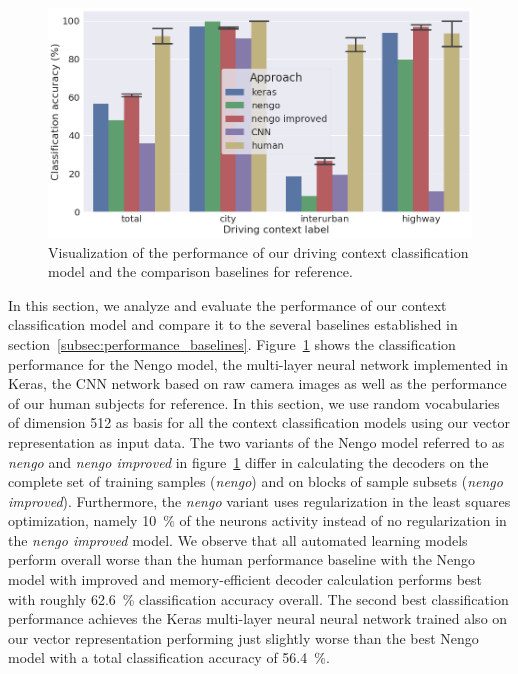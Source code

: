 \begin{figure}[t]
    \centering
    \includegraphics[width=0.9\linewidth]{imgs/context_class_approaches.png}
    \caption{Visualization of the performance of our driving context classification model and the comparison baselines for reference.}
    \label{fig:context_class_approaches}
\end{figure}

In this section, we analyze and evaluate the performance of our context classification model and compare it to the several baselines established in section~\ref{subsec:performance_baselines}.
Figure~\ref{fig:context_class_approaches} shows the classification performance for the \ac{Nengo} model, the multi-layer neural network implemented in Keras, the \ac{CNN} network based on raw camera images as well as the performance of our human subjects for reference.
In this section, we use random vocabularies of dimension \num{512} as basis for all the context classification models using our vector representation as input data.
The two variants of the \ac{Nengo} model referred to as \emph{nengo} and \emph{nengo improved} in figure~\ref{fig:context_class_approaches} differ in calculating the decoders on the complete set of training samples (\emph{nengo}) and on blocks of sample subsets (\emph{nengo improved}).
Furthermore, the \emph{nengo} variant uses regularization in the least squares optimization, namely \SI{10}{\percent} of the neurons activity instead of no regularization in the \emph{nengo improved} model.
We observe that all automated learning models perform overall worse than the human performance baseline with the \ac{Nengo} model with improved and memory-efficient decoder calculation performs best with roughly \SI{62.6}{\percent} classification accuracy overall.
The second best classification performance achieves the Keras multi-layer neural neural network trained also on our vector representation performing just slightly worse than the best \ac{Nengo} model with a total classification accuracy of \SI{56.4}{\percent}.

